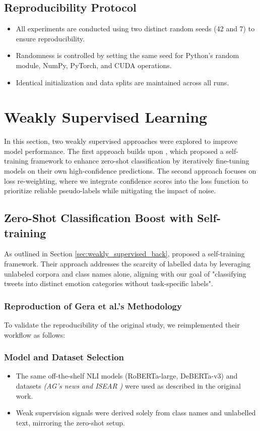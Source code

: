 \subsection*{Reproducibility Protocol}
\begin{itemize}
    \item All experiments are conducted using two distinct random seeds (42 and 7) to ensure reproducibility.
    \item Randomness is controlled by setting the same seed for Python's random module, NumPy, PyTorch, and CUDA operations.
    \item Identical initialization and data splits are maintained across all runs.
\end{itemize}


\section{Weakly Supervised Learning}

In this section, two weakly supervised approaches were explored to improve model performance. The first approach builds upon \cite{gera_zero-shot_2022}, which proposed a self-training framework to enhance zero-shot classification by iteratively fine-tuning models on their own high-confidence predictions. The second approach focuses on loss re-weighting, where we integrate confidence scores into the loss function to prioritize reliable pseudo-labels while mitigating the impact of noise.

\subsection{Zero-Shot Classification Boost with Self-training}
As outlined in Section \ref{sec:weakly_supervised_back}, \cite{gera_zero-shot_2022} proposed a self-training framework. Their approach addresses the scarcity of labelled data by leveraging unlabeled corpora and class names alone, aligning with our goal of "classifying tweets into distinct emotion categories without task-specific labels". 

\subsubsection*{Reproduction of Gera et al.’s Methodology}
To validate the reproducibility of the original study, we reimplemented their workflow as follows:

\subsubsection*{Model and Dataset Selection}
\begin{itemize}
    \item The same off-the-shelf NLI models (RoBERTa-large, DeBERTa-v3) and datasets \textit{(AG’s news \cite{DBLP:journals/corr/ZhangZL15} and ISEAR \cite{Shao2015UniversalityVC})} were used as described in the original work.
    \item Weak supervision signals were derived solely from class names and unlabelled text, mirroring the zero-shot setup.
\end{itemize}

